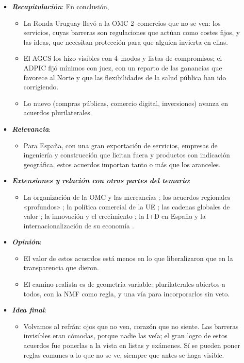 \documentclass[11pt]{article}
\begin{document}
\begin{itemize}
\item \textbf{\emph{Recapitulación}}: En conclusión,
  \begin{itemize}
  \item La Ronda Uruguay llevó a la OMC 2~comercios que no se ven: los servicios, cuyas barreras son regulaciones que actúan como costes fijos, y las ideas, que necesitan protección para que alguien invierta en ellas.
  \item El AGCS los hizo visibles con 4~modos y listas de compromisos; el ADPIC fijó mínimos con juez, con un reparto de las ganancias que favorece al Norte y que las flexibilidades de la salud pública han ido corrigiendo.
  \item Lo nuevo (compras públicas, comercio digital, inversiones) avanza en acuerdos plurilaterales.
  \end{itemize}
\item \textbf{\emph{Relevancia}}:
  \begin{itemize}
  \item Para España, con una gran exportación de servicios, empresas de ingeniería y construcción que licitan fuera y productos con indicación geográfica, estos acuerdos importan tanto o más que los aranceles.
  \end{itemize}
\item \textbf{\emph{Extensiones y relación con otras partes del temario}}:
  \begin{itemize}
  \item La organización de la OMC y las mercancías ; los acuerdos regionales «profundos» ; la política comercial de la UE ; las cadenas globales de valor ; la innovación y el crecimiento ; la I+D en España  y la internacionalización de su economía .
  \end{itemize}
\item \textbf{\emph{Opinión}}:
  \begin{itemize}
  \item El valor de estos acuerdos está menos en lo que liberalizaron que en la transparencia que dieron.
  \item El camino realista es de geometría variable: plurilaterales abiertos a todos, con la NMF como regla, y una vía para incorporarlos sin veto.
  \end{itemize}
\item \textbf{\emph{Idea final}}:
  \begin{itemize}
  \item Volvamos al refrán: ojos que no ven, corazón que no siente. Las barreras invisibles eran cómodas, porque nadie las veía; el gran logro de estos acuerdos fue ponerlas a la vista en listas y exámenes. Sí se pueden poner reglas comunes a lo que no se ve, siempre que antes se haga visible.
  \end{itemize}
\end{itemize}
\end{document}

